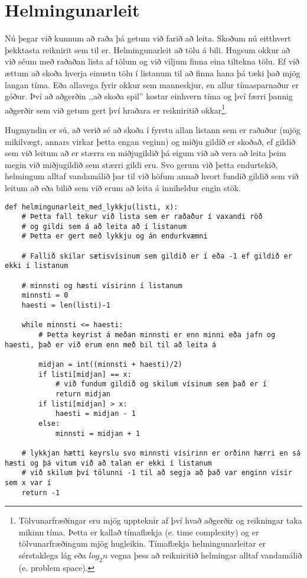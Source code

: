 \section{Helmingunarleit}\label{uk:reiknirit-helmingunarleit}
Nú þegar við kunnum að raða þá getum við farið að leita.
Skoðum nú eitthvert þekktasta reiknirit sem til er. 
Helmingunarleit að tölu á bili. 
Hugsum okkur að við séum með raðaðan lista af tölum og við viljum finna eina tiltekna tölu. 
Ef við ættum að skoða hverja einustu tölu í listanum til að finna hana þá tæki það mjög langan tíma.
Eða allavega fyrir okkur sem manneskjur, en allur tímasparnaður er góður.
Því að aðgerðin ,,að skoða spil'' kostar einhvern tíma og því færri þannig aðgerðir sem við getum gert því hraðara er reikniritið okkar\footnote{Tölvunarfræðingar eru mjög uppteknir af því hvað aðgerðir og reikningar taka mikinn tíma.
	Þetta er kallað tímaflækja (e. time complexity) og er tölvunarfræðingum mjög hugleikin.
	Tímaflækja helmingunarleitar er sérstaklega lág eða $log_2{n}$ vegna þess að reikniritið helmingar alltaf vandamálið (e. problem space).}.

Hugmyndin er sú, að verið sé að skoða í fyrstu allan listann sem er raðaður (mjög mikilvægt, annars virkar þetta engan veginn) og miðju gildið er skoðað, ef gildið sem við leitum að er stærra en miðjugildið þá eigum við að vera að leita þeim megin við miðjugildið sem stærri gildi eru.
Svo gerum við þetta endurtekið, helmingum alltaf vandamálið þar til við höfum annað hvort fundið gildið sem við leitum að eða bilið sem við erum að leita á inniheldur engin stök.


\begin{lstlisting}[caption=Helmingunarleit að tölu í röðuðum lista með lykkju, label=lst:reiknirit-helm-for]
	def helmingunarleit_med_lykkju(listi, x):
	# Þetta fall tekur við lista sem er raðaður í vaxandi röð
	# og gildi sem á að leita að í listanum
	# Þetta er gert með lykkju og án endurkvæmni
	
	# Fallið skilar sætisvísinum sem gildið er í eða -1 ef gildið er ekki í listanum
	
	# minnsti og hæsti vísirinn í listanum
	minnsti = 0
	haesti = len(listi)-1
	
	while minnsti <= haesti:
		# Þetta keyrist á meðan minnsti er enn minni eða jafn og haesti, það er við erum enn með bil til að leita á
	
		midjan = int((minnsti + haesti)/2)
		if listi[midjan] == x:
			# við fundum gildið og skilum vísinum sem það er í
			return midjan
		if listi[midjan] > x:
			haesti = midjan - 1
		else:
			minnsti = midjan + 1
	
	# lykkjan hætti keyrslu svo minnsti vísirinn er orðinn hærri en sá hæsti og þá vitum við að talan er ekki í listanum 
	# við skilum því tölunni -1 til að segja að það var enginn vísir sem x var í
	return -1
\end{lstlisting}

